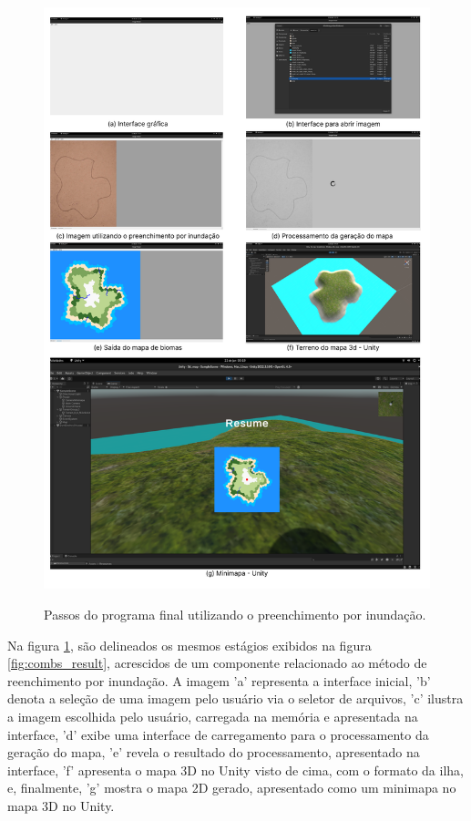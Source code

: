 \begin{figure}[!ht]
	\centering
    \caption{Passos do programa final utilizando o preenchimento por inundação.}
	\includegraphics[width=\textwidth]{figures/geracao_balde_tinta.png}
	\label{fig:combs_result_2}
\end{figure}

\pagebreak

Na figura \cref{fig:combs_result_2}, são delineados os mesmos estágios exibidos na figura \cref{fig:combs_result}, acrescidos de um componente relacionado ao método de reenchimento por inundação. A imagem 'a' representa a interface inicial, 'b' denota a seleção de uma imagem pelo usuário via o seletor de arquivos, 'c' ilustra a imagem escolhida pelo usuário, carregada na memória e apresentada na interface, 'd' exibe uma interface de carregamento para o processamento da geração do mapa, 'e' revela o resultado do processamento, apresentado na interface, 'f' apresenta o mapa 3D no Unity visto de cima, com o formato da ilha, e, finalmente, 'g' mostra o mapa 2D gerado, apresentado como um minimapa no mapa 3D no Unity.